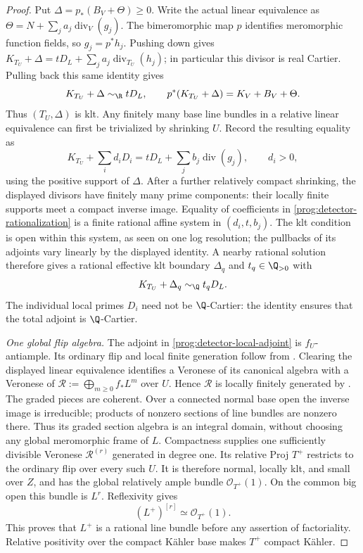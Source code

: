 \begin{proof}
Put $\Delta=p_*(B_V+\Theta)\geq0$. Write the actual linear equivalence
as $\Theta=N+\sum_j a_j\operatorname{div}_V(g_j)$.
The bimeromorphic map $p$ identifies meromorphic function fields, so
$g_j=p^*h_j$. Pushing down gives
$K_{T_U}+\Delta=tD_L+\sum_j a_j\operatorname{div}_{T_U}(h_j)$;
in particular this divisor is real Cartier. Pulling back this same
identity gives
\[
 K_{T_U}+\Delta\sim_{\R}tD_L,
 \qquad p^*(K_{T_U}+\Delta)=K_V+B_V+\Theta.
\]
Thus $(T_U,\Delta)$ is klt. Any finitely many base line bundles in a
relative linear equivalence can first be trivialized by shrinking $U$.
Record the resulting equality as
\begin{equation}\label{prog:detector-rationalization}
 K_{T_U}+\sum_i d_iD_i=tD_L+\sum_j b_j\operatorname{div}(g_j),
 \qquad d_i>0,
\end{equation}
using the positive support of $\Delta$. After a further relatively
compact shrinking, the displayed divisors have finitely many prime
components: their locally finite supports meet a compact inverse image.
Equality of coefficients in \eqref{prog:detector-rationalization} is a
finite rational affine system in $(d_i,t,b_j)$. The klt condition is
open within this system, as seen on one log resolution; the pullbacks
of its adjoints vary linearly by the displayed identity. A nearby
rational solution therefore gives a rational effective klt boundary
$\Delta_q$ and $t_q\in\Q_{>0}$ with
\begin{equation}\label{prog:detector-local-adjoint}
 K_{T_U}+\Delta_q\sim_{\Q}t_qD_L.
\end{equation}
The individual local primes $D_i$ need not be $\Q$-Cartier: the identity
ensures that the total adjoint is $\Q$-Cartier.

\smallskip\noindent
\emph{One global flip algebra.}
The adjoint in \eqref{prog:detector-local-adjoint} is $f_U$-antiample.
Its ordinary flip and local finite generation follow from
\cite[Theorems~1.14 and~1.18]{FujinoAnalyticBCHM}. Clearing the displayed
linear equivalence identifies a Veronese of its canonical algebra
with a Veronese of $\mathcal R:=\bigoplus_{m\geq0}f_*L^m$ over $U$.
Hence $\mathcal R$ is locally finitely generated by
\cite[Lemma~2.26]{FujinoAnalyticBCHM}. The graded pieces are coherent. Over a connected normal base open
the inverse image is irreducible; products of nonzero sections of line
bundles are nonzero there. Thus its graded section algebra is an
integral domain, without choosing any global meromorphic frame of $L$.
Compactness supplies one sufficiently divisible Veronese
$\mathcal R^{(r)}$ generated in degree one. Its relative Proj $T^+$
restricts to the ordinary flip over every such $U$. It is therefore
normal, locally klt, and small over $Z$, and has the global relatively
ample bundle
$\mathcal O_{T^+}(1)$. On the common big open this bundle is $L^r$.
Reflexivity gives
\[
 (L^+)^{[r]}\simeq\mathcal O_{T^+}(1).
\]
This proves that $L^+$ is a rational line bundle before any assertion
of factoriality. Relative positivity over the compact K\"ahler base
makes $T^+$ compact K\"ahler.


\end{proof}
